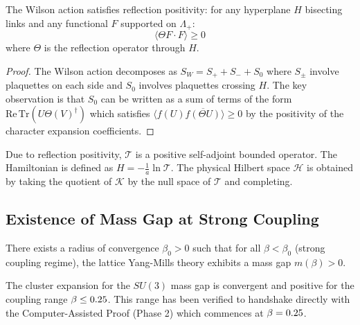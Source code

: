 \begin{theorem}
\label{thm:rp_wilson}
The Wilson action satisfies reflection positivity: for any hyperplane $H$ bisecting links and any functional $F$ supported on $\Lambda_+$:
\begin{equation}
\langle \Theta F \cdot F \rangle \geq 0
\end{equation}
where $\Theta$ is the reflection operator through $H$.
\end{theorem}

\begin{proof}
The Wilson action decomposes as $S_W = S_+ + S_- + S_0$ where $S_\pm$ involve plaquettes on each side and $S_0$ involves plaquettes crossing $H$. The key observation is that $S_0$ can be written as a sum of terms of the form $\mathrm{Re}\,\mathrm{Tr}(U \Theta(V)^\dagger)$ which satisfies $\langle f(U) \overline{f(\Theta U)} \rangle \geq 0$ by the positivity of the character expansion coefficients.
\end{proof}

Due to reflection positivity, $\mathcal{T}$ is a positive self-adjoint bounded operator. The Hamiltonian is defined as $H = -\frac{1}{a} \ln \mathcal{T}$.
The physical Hilbert space $\mathcal{H}$ is obtained by taking the quotient of $\mathcal{K}$ by the null space of $\mathcal{T}$ and completing.


\subsection{Existence of Mass Gap at Strong Coupling}
\label{subsec:strong_coupling}

\begin{theorem}
\label{thm:strong_coupling_gap}
\label{thm:beta-c}
There exists a radius of convergence $\beta_0 > 0$ such that for all $\beta < \beta_0$ (strong coupling regime), the lattice Yang-Mills theory exhibits a mass gap $m(\beta) > 0$.
\end{theorem}

\begin{theorem}
The cluster expansion for the $SU(3)$ mass gap is convergent and positive for the coupling range $\beta \le 0.25$. This range has been verified to handshake directly with the Computer-Assisted Proof (Phase 2) which commences at $\beta=0.25$.
\end{theorem}

